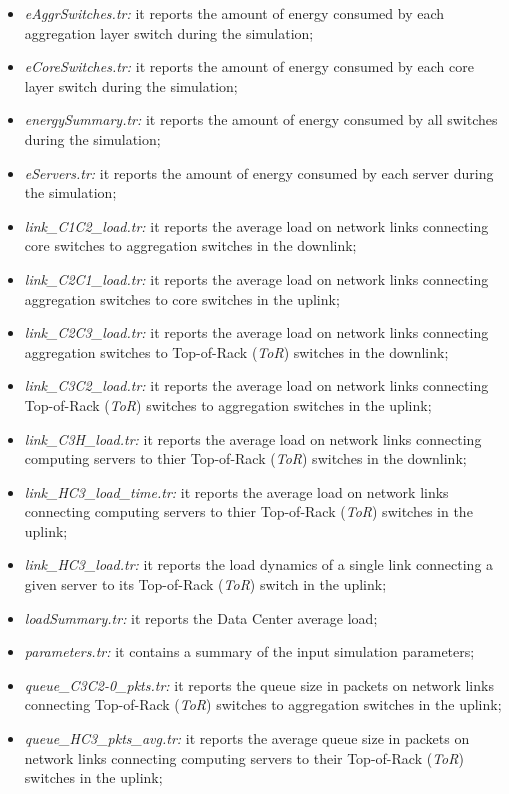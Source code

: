 \begin{itemize}
    \item \emph{eAggrSwitches.tr:} it reports the amount of energy consumed by each aggregation layer switch during the simulation;
    \item \emph{eCoreSwitches.tr:} it reports the amount of energy consumed by each core layer switch during the simulation;
    \item \emph{energySummary.tr:} it reports the amount of energy consumed by all switches during the simulation;
    \item \emph{eServers.tr:} it reports the amount of energy consumed by each server during the simulation;
    \item \emph{link\_C1C2\_load.tr:} it reports the average load on network links connecting core switches to aggregation switches in the downlink;
    \item \emph{link\_C2C1\_load.tr:} it reports the average load on network links connecting aggregation switches to core switches in the uplink;
    \item \emph{link\_C2C3\_load.tr:} it reports the average load on network links connecting aggregation switches to Top-of-Rack (\emph{ToR}) switches in the downlink;
    \item \emph{link\_C3C2\_load.tr:} it reports the average load on network links connecting Top-of-Rack (\emph{ToR}) switches to aggregation switches in the uplink;
    \item \emph{link\_C3H\_load.tr:} it reports the average load on network links connecting computing servers to thier Top-of-Rack (\emph{ToR}) switches in the downlink;
    \item \emph{link\_HC3\_load\_time.tr:} it reports the average load on network links connecting computing servers to thier Top-of-Rack (\emph{ToR}) switches in the uplink; 
    \item \emph{link\_HC3\_load.tr:} it reports the load dynamics of a single link connecting a given server to its Top-of-Rack (\emph{ToR}) switch in the uplink; 
    \item \emph{loadSummary.tr:} it reports the Data Center average load;
    \item \emph{parameters.tr:} it contains a summary of the input simulation parameters;
    \item \emph{queue\_C3C2-0\_pkts.tr:} it reports the queue size in packets on network links connecting Top-of-Rack (\emph{ToR}) switches to aggregation switches in the uplink;
    \item \emph{queue\_HC3\_pkts\_avg.tr:} it reports the average queue size in packets on network links connecting computing servers to their Top-of-Rack (\emph{ToR}) switches in the uplink;

\end{itemize}
